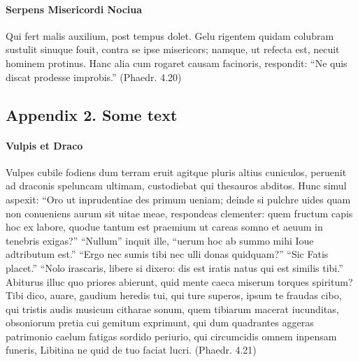 \documentclass[english]{jamk-report}
\begin{document}
\paragraph{Serpens Misericordi Nociua}
Qui fert malis auxilium, post tempus dolet.
Gelu rigentem quidam colubram sustulit
sinuque fouit, contra se ipse misericors;
namque, ut refecta est, necuit hominem protinus.
Hanc alia cum rogaret causam facinoris,
respondit: ``Ne quis discat prodesse improbis.''
(Phaedr. 4.20)



\clearpage

\subsection*{Appendix 2. Some text}

\paragraph{Vulpis et Draco}
Vulpes cubile fodiens dum terram eruit
agitque pluris altius cuniculos,
peruenit ad draconis speluncam ultimam,
custodiebat qui thesauros abditos.
Hunc simul aspexit: ``Oro ut inprudentiae
des primum ueniam; deinde si pulchre uides
quam non conueniens aurum sit uitae meae,
respondeas clementer: quem fructum capis
hoc ex labore, quodue tantum est praemium
ut careas somno et aeuum in tenebris exigas?''
``Nullum'' inquit ille, ``uerum hoc ab summo mihi
Ioue adtributum est.'' ``Ergo nec sumis tibi
nec ulli donas quidquam?'' ``Sic Fatis placet.''
``Nolo irascaris, libere si dixero:
dis est iratis natus qui est similis tibi.''
Abiturus illuc quo priores abierunt,
quid mente caeca miserum torques spiritum?
Tibi dico, auare, gaudium heredis tui,
qui ture superos, ipsum te fraudas cibo,
qui tristis audis musicum citharae sonum,
quem tibiarum macerat iucunditas,
obsoniorum pretia cui gemitum exprimunt,
qui dum quadrantes aggeras patrimonio
caelum fatigas sordido periurio,
qui circumcidis omnem inpensam funeris,
Libitina ne quid de tuo faciat lucri.
(Phaedr. 4.21)

\clearpage
\end{document}
